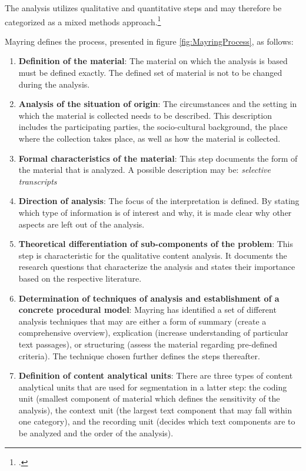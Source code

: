 The analysis utilizes qualitative and quantitative steps and may therefore be categorized as a mixed methods approach.\footcite[Cf.][p.10]{MayringQualitativeContentAnalysis2014}

Mayring defines the process, presented in figure \ref{fig:MayringProcess}, as follows: 
\begin{enumerate}
    \item \textbf{Definition of the material}: The material on which the analysis is based must be defined exactly. The defined set of material is not to be changed during the analysis.
    \item \textbf{Analysis of the situation of origin}: The circumstances and the setting in which the material is collected needs to be described. This description includes the participating parties, the socio-cultural background, the place where the collection takes place, as well as how the material is collected.
    \item \textbf{Formal characteristics of the material}: This step documents the form of the material that is analyzed. A possible description may be: \textit{selective transcripts}
    \item \textbf{Direction of analysis}: The focus of the interpretation is defined. By stating which type of information is of interest and why, it is made clear why other aspects are left out of the analysis.
    \item \textbf{Theoretical differentiation of sub-components of the problem}: This step is characteristic for the qualitative content analysis. It documents the research questions that characterize the analysis and states their importance based on the respective literature.
    \item \textbf{Determination of techniques of analysis and establishment of a concrete procedural model}: Mayring has identified a set of different analysis techniques that may are either a form of summary (create a comprehensive overview), explication (increase understanding of particular text passages), or structuring (assess the material regarding pre-defined criteria). The technique chosen further defines the steps thereafter.
    \item \textbf{Definition of content analytical units}: There are three types of content analytical units that are used for segmentation in a latter step: the coding unit (smallest component of material which defines the sensitivity of the analysis), the context unit (the largest text component that may fall within one category), and the recording unit (decides which text components are to be analyzed and the order of the analysis).

\end{enumerate}
